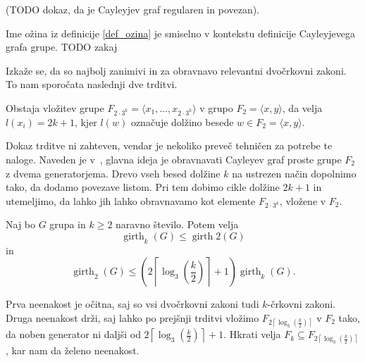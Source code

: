 \documentclass[mat1, tisk]{fmfdelo}
\numberwithin{equation}{section}  %
\begin{document}
(TODO dokaz, da je Cayleyjev graf regularen in povezan).

\begin{opomba}
Ime ožina iz definicije \ref{def_ozina} je smiselno v kontekstu definicije Cayleyjevega grafa grupe. TODO zakaj
\end{opomba}


Izkaže se, da so najbolj zanimivi in za obravnavo relevantni dvočrkovni zakoni. To nam sporočata naslednji dve trditvi.
\begin{trditev}
\label{trd_vlozitev_proste_grupe}
 Obstaja vložitev grupe $F_{2 \cdot 3^{k}} = \langle x_1, \ldots, x_{2 \cdot 3^{k}} \rangle$ v grupo $F_2 = \langle x,y \rangle $, da velja $l(x_i) = 2k + 1$, kjer $l(w)$ označuje dolžino besede $w \in F_2 = \langle x,y \rangle$. 
\end{trditev}


\begin{dokaz}
Dokaz trditve ni zahteven, vendar je nekoliko preveč tehničen za potrebe te naloge. Naveden je v~\cite[str.~5]{Schneider_2016}, glavna ideja je obravnavati Cayleyev graf proste grupe $F_2$ z dvema generatorjema.
Drevo vseh besed dolžine $k$ na ustrezen način dopolnimo tako, da dodamo povezave listom. Pri tem dobimo cikle dolžine $2k + 1$ in utemeljimo, da lahko jih lahko obravnavamo kot elemente $F_{2 \cdot 3^{k}}$, vložene v $F_2$. 
\end{dokaz}


\begin{posledica}\label{psl_veccrkovni_zakoni_meje}
Naj bo $G$ grupa in $k \ge 2$ naravno število. Potem velja \begin{equation*}
     \operatorname{girth}_{k}(G) \le  \operatorname{girth}{2}(G) 
\end{equation*}  
in \begin{equation*}
\operatorname{girth}_{2}(G) \le \left( {2 \left\lceil \log_3(\frac{k}{2}) \right\rceil + 1  } \right) \operatorname{girth}_{k}(G).
\end{equation*}  
\end{posledica}
\begin{dokaz}
    Prva neenakost je očitna, saj so vsi dvočrkovni zakoni tudi $k$-črkovni zakoni. Druga neenakost drži, saj lahko po prejšnji trditvi vložimo $F_{{2 \left\lceil \log_3(\frac{k}{2}) \right\rceil}}$ v $F_2$
    tako, da noben generator ni daljši od ${2 \left\lceil \log_3(\frac{k}{2}) \right\rceil + 1  }$. Hkrati velja $F_k \subseteq F_{{2 \left\lceil \log_3(\frac{k}{2}) \right\rceil}}$, kar nam da želeno neenakost.
\end{dokaz}
\end{document}
